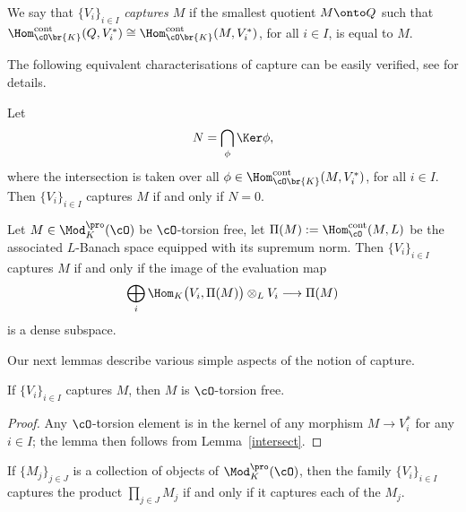 \begin{defi}\label{defi_capture}We say
that $\{V_i\}_{i\in I}$ \textit{captures $M$} if the smallest quotient
$M\onto Q$ such that
$\Hom_{\cO\br{K}}^{\rm cont}(Q, V_i^*)\cong \Hom_{\cO\br{K}}^{\rm cont}(M, V_i^*)$, for all $i\in I$, is equal to $M$.
\end{defi}

The following equivalent characterisations of capture can be easily verified, see \cite[\S 2.4]{CDP} for details.

\begin{lem}\label{intersect} Let
\[
N=\bigcap_{\phi} \Ker \phi,
\]
where the intersection is taken over all
$\phi\in \Hom_{\cO\br{K}}^{\rm cont}(M, V_i^*)$, for all $i\in I$.
Then $\{V_i\}_{i\in I}$ captures $M$ if and only if $N=0$.
\end{lem}

\begin{lem}\label{capture_banach} Let $M\in \Mod^{\pro}_K(\cO)$ be $\cO$-torsion free, let $\Pi(M):=\Hom_{\cO}^{\rm cont}(M, L)$ be the associated
$L$-Banach space equipped with its supremum norm. Then
$\{V_i\}_{i\in I}$ captures $M$ if and only if the image of the evaluation map
\[
\bigoplus_i \Hom_K\bigl(V_i, \Pi(M)\bigr)\otimes_L V_i \longrightarrow \Pi(M)
\]
is a dense subspace.
\end{lem}

Our next lemmas describe various simple aspects of the notion of capture.

\begin{lem}
\label{torsion escapes}
If $\{V_i\}_{i \in I}$ captures $M$, then $M$ is $\cO$-torsion free.
\end{lem}

\begin{proof}
Any $\cO$-torsion element is in the kernel of any morphism $M\to V_i^*$
for any $i \in I$; the lemma then follows from Lemma~\ref{intersect}.
\end{proof}

\begin{lem}\label{capture_product}
If $\{M_j\}_{j \in J}$ is a collection of objects of
$\Mod^{\pro}_K(\cO)$,
then the family $\{V_i\}_{i \in I}$ captures the product $\prod_{j \in J}M_j$
if and only if it captures each of the $M_j$.
\end{lem}

